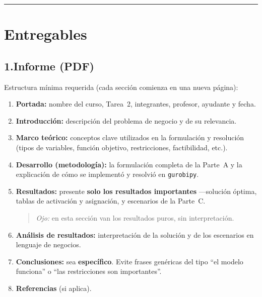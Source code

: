 \documentclass[12pt,a4paper]{article}
\begin{document}
\noindent\rule{\linewidth}{0.4pt}

\section*{Entregables}

\subsection*{1.\quad Informe (PDF)}

Estructura mínima requerida (cada sección comienza en una nueva página):

\begin{enumerate}[leftmargin=*, topsep=2pt]
    \item \textbf{Portada:} nombre del curso, Tarea~2, integrantes, profesor,
          ayudante y fecha.
    \item \textbf{Introducción:} descripción del problema de negocio y de su
          relevancia.
    \item \textbf{Marco teórico:} conceptos clave utilizados en la formulación
          y resolución (tipos de variables, función objetivo, restricciones,
          factibilidad, etc.).
    \item \textbf{Desarrollo (metodología):} la formulación completa de la
          Parte~A y la explicación de cómo se implementó y resolvió en
          \texttt{gurobipy}.
    \item \textbf{Resultados:} presente \textbf{solo los resultados
          importantes} —solución óptima, tablas de activación y asignación,
          y escenarios de la Parte~C.
          \begin{quote}
          \textit{Ojo:} en esta sección van los resultados puros, sin
          interpretación.
          \end{quote}
    \item \textbf{Análisis de resultados:} interpretación de la solución y de
          los escenarios en lenguaje de negocios.
    \item \textbf{Conclusiones:} sea \textbf{específico}. Evite frases genéricas
          del tipo ``el modelo funciona'' o ``las restricciones son
          importantes''.
    \item \textbf{Referencias} (si aplica).
\end{enumerate}
\end{document}
